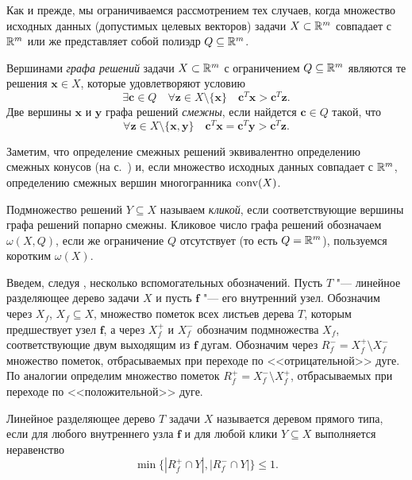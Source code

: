 Как и прежде, мы ограничиваемся рассмотрением тех случаев, когда множество исходных данных (допустимых целевых векторов) задачи $X \subset \mathbb{R}^m$ совпадает с $\mathbb{R}^m$ или же представляет собой полиэдр $Q \subseteq \mathbb{R}^m$.

\begin{definition}
\label{def:AdjSolutions}
Вершинами \emph{графа решений} задачи $X \subset \mathbb{R}^m$ с ограничением $Q \subseteq \mathbb{R}^m$ являются те решения $\bm{x} \in X$, которые удовлетворяют условию 
\begin{equation*}
	\exists \bm{c} \in Q \quad \forall \bm{z}\in X \setminus \{\bm{x}\} \quad \bm{c}^T \bm{x} > \bm{c}^T \bm{z}.
\end{equation*}
Две вершины $\bm{x}$ и $\bm{y}$ графа решений \emph{смежны}, если найдется $\bm{c} \in Q$ такой, что
\begin{equation*}
	\forall \bm{z}\in X \setminus \{\bm{x}, \bm{y}\} \quad \bm{c}^T \bm{x} = \bm{c}^T \bm{y} > \bm{c}^T \bm{z}.
\end{equation*}
\end{definition}

Заметим, что определение смежных решений эквивалентно определению смежных конусов (на с.~\pageref{AdjCones}) и, если множество исходных данных совпадает с $\mathbb{R}^m$, определению смежных вершин многогранника $\operatorname{conv}(X)$.

Подмножество решений $Y \subseteq X$ называем \emph{кликой}, если соответствующие вершины графа решений попарно смежны.
Кликовое число графа решений обозначаем $\omega(X,Q)$, если же ограничение $Q$ отсутствует (то есть $Q = \mathbb{R}^m$), пользуемся коротким $\omega(X)$.

Введем, следуя \cite{BondBook:1995}, несколько вспомогательных обозначений.
Пусть $T$ "--- линейное  разделяющее  дерево  задачи $X$  и
пусть $\bm{f}$ "---  его  внутренний  узел.
Обозначим через $X_f$, $X_f \subseteq X$,  множество пометок всех листьев дерева $T$,
которым  предшествует  узел $\bm{f}$, а через $X_f^+$ и $X_f^-$  обозначим
подмножества $X_f$, соответствующие  двум выходящим из $\bm{f}$ дугам.
Обозначим через $R_f^- = X_f^+ \setminus X_f^-$ множество пометок,
отбрасываемых при переходе по <<отрицательной>> дуге.
По аналогии определим множество пометок $R_f^+ = X_f^- \setminus X_f^+$,
отбрасываемых при переходе по <<положительной>> дуге.

\begin{definition} %
	\label{def:direct-type}
	Линейное разделяющее  дерево $T$ задачи $X$
	называется деревом прямого типа, если для любого внутреннего узла $\bm{f}$ и
	для любой клики $Y \subseteq X$ выполняется неравенство
	\begin{equation}
	\min \{ |R_f^+ \cap Y|, |R_f^- \cap Y| \} \le 1.
	\label{eq:direct-type}
	\end{equation}
\end{definition}


